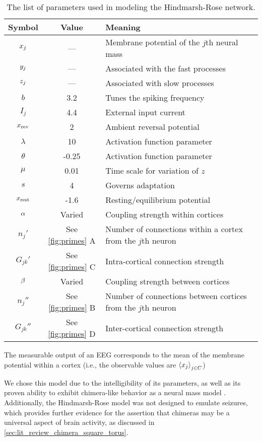 \begin{table}[ht]
  \centering
  \begin{tabular}{c | c | p{}}
    Symbol & Value & Meaning \\ \hline
    $x_{j}$ & --- & Membrane potential of the $j$th neural mass \\
    $y_{j}$ & --- & Associated with the fast processes \\
    $z_{j}$ & --- & Associated with slow processes \\ \hline
    $b$ & 3.2 & Tunes the spiking frequency \\
    $I_{j}$ & 4.4 & External input current \\
    $x_{\text{rev}}$ & 2 & Ambient reversal potential \\
    $\lambda$ & 10 & Activation function parameter \\
    $\theta$ & -0.25 & Activation function parameter \\
    $\mu$ & 0.01 & Time scale for variation of $z$ \\
    $s$ & 4 & Governs adaptation \\
    $x_{\text{rest}}$ & -1.6 & Resting/equilibrium potential \\ \hline
    $\alpha$ & Varied & Coupling strength within cortices \\
    $n_{j}'$ & See \cref{fig:primes} A & Number of connections within a cortex from the $j$th neuron \\
    $G_{j k}'$ & See \cref{fig:primes} C & Intra-cortical connection strength \\
    $\beta$ & Varied & Coupling strength between cortices \\
    $n_{j}''$ & See \cref{fig:primes} B & Number of connections between cortices from the $j$th neuron \\
    $G_{j k}''$ & See \cref{fig:primes} D & Inter-cortical connection strength
  \end{tabular}
  \caption[Hindmarsh-Rose Parameters]{The list of parameters used in modeling the Hindmarsh-Rose network.}
  \label{tab:hr_params}
\end{table}

The measurable output of an EEG corresponds to the mean of the membrane potential within a cortex
(i.e., the observable values are $\expval{x_{j}}_{j \in C}$)

We chose this model due to the intelligibility of its parameters, as well as its proven ability to exhibit chimera-like behavior as a neural mass model \cite{Santos2017}.
Additionally, the Hindmarsh-Rose model was not designed to emulate seizures, which provides further evidence for the assertion that chimeras may be a universal aspect of brain activity, as discussed in \cref{sec:lit_review_chimera_square_torus}.

